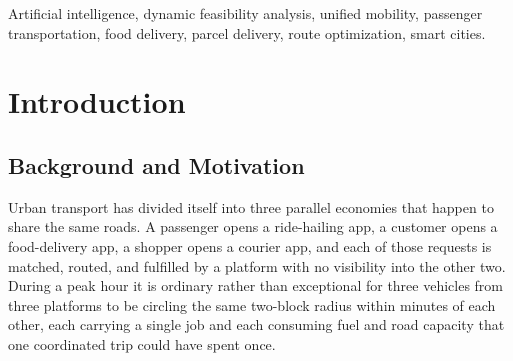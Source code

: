 \documentclass[conference]{IEEEtran}
\begin{document}
\begin{abstract}
Ride-hailing, food delivery, and parcel courier services dispatch vehicles
over the same streets at the same hours without exchanging information, so a
driver who has just released a food order routinely passes a waiting passenger
that the same trip could have carried. This paper presents an AI-powered
unified mobility and delivery system organised around a Dynamic Feasibility
Intelligence Framework (DFIF), which decides in real time whether a passenger
ride, a food order, and a parcel drop can be served by one trip before any
route is planned or any driver is committed. Candidate requests are screened
on five dimensions---pickup proximity, route similarity, time-window overlap,
vehicle capacity, and request priority---and combined into a compatibility
score that governs batch admission. The scoring layer is augmented with a
gradient-based coefficient-learning rule so that the weighting can be adapted
from observed batching outcomes instead of remaining hand-fixed. Admitted
batches are routed by a Google OR-Tools constraint solver over Google Maps API
data, and assigned by a module weighing driver proximity, availability, and
estimated arrival time rather than proximity alone. The scoring function is
given a formal treatment covering boundedness, Lipschitz sensitivity of the
time term, a worst-case suboptimality bound, and the complexity effect of
feasibility-first filtering.
A pilot deployment processed 43 live requests across three provider
integrations. Relative to independent dispatch, total travel distance fell
from 320~km to 250~km, fuel from 38~L to 30~L, average delay from 12~min to
7~min, and estimated CO\textsubscript{2} from 80~kg to 63~kg. The delay
improvement (41.7\%) was close to twice the distance-linked improvements
(21.1--21.9\%), matching the asymmetry the Lipschitz analysis predicts.
\end{abstract}

\begin{IEEEkeywords}
Artificial intelligence, dynamic feasibility analysis, unified mobility,
passenger transportation, food delivery, parcel delivery, route optimization,
smart cities.
\end{IEEEkeywords}

\section{Introduction}

\subsection{Background and Motivation}
Urban transport has divided itself into three parallel economies that happen
to share the same roads. A passenger opens a ride-hailing app, a customer
opens a food-delivery app, a shopper opens a courier app, and each of those
requests is matched, routed, and fulfilled by a platform with no visibility
into the other two. During a peak hour it is ordinary rather than exceptional
for three vehicles from three platforms to be circling the same two-block
radius within minutes of each other, each carrying a single job and each
consuming fuel and road capacity that one coordinated trip could have spent
once.
\end{document}
